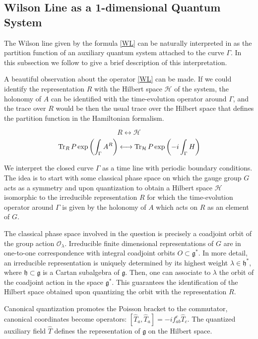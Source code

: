 \documentclass[11pt]{report}
\theoremstyle{plain}
\theoremstyle{definition}
\theoremstyle{remark}
\theoremstyle{remark}
\numberwithin{equation}{section}
\begin{document}
\subsection{Wilson Line as a 1-dimensional Quantum System}

The Wilson line given by the formula \eqref{WL} can be naturally interpreted in as the partition function of an auxiliary quantum system attached to the curve $\Gamma$. In this subsection we follow \cite{CB} to give a brief description of this interpretation. 

A beautiful observation about the operator \eqref{WL} can be made. If we could identify the representation $R$ with the Hilbert space $\mathcal{H}$ of the system, the holonomy of $A$ can be identified with the time-evolution operator around $\Gamma$, and the trace over $R$ would be then the usual trace over the Hilbert space that defines the partition function in the Hamiltonian formalism.

$$
R \longleftrightarrow \mathcal{H}
$$
\begin{equation}
{\rm Tr}_R \, P\exp\left( \int_\Gamma A^R\right) \longleftrightarrow  {\rm Tr}_{\mathcal{H}} \, P\exp\left( -i\int_\Gamma H\right)
\end{equation}

We interpret the closed curve $\Gamma$ as a time line with periodic boundary conditions. 
The idea is to start with some classical phase space on which the gauge group $G$ acts as a symmetry and upon quantization to obtain a Hilbert space $\mathcal{H}$ isomorphic to the irreducible representation $R$ for which the time-evolution operator around $\Gamma$ is given by the holonomy of $A$ which acts on $R$ as an element of $G$.

The classical phase space involved in the question is precisely a coadjoint orbit of the group action $\mathcal{O}_\lambda$. 
Irreducible finite dimensional representations of $G$ are in one-to-one correspondence with integral coadjoint orbits $O \subset \mathfrak{g}^*$. In more detail, an irreducible representation is uniquely determined by its highest weight $\lambda \in \mathfrak{h}^*$, where $\mathfrak{h} \subset \mathfrak{g}$ is a Cartan subalgebra of $\mathfrak{g}$. Then, one can associate to $\lambda$ the orbit of the coadjoint action in the space $\mathfrak{g}^*$. This guarantees the identification of the Hilbert space obtained upon quantizing the orbit with the representation $R$. 

Canonical quantization promotes the Poisson bracket to the commutator, canonical coordinates become operators: $[\hat{T}_a,  \hat{T}_a] = -if_{ab}^c \hat{T}_c$. The quantized auxiliary field $\hat{T}$ defines the representation of $\mathfrak{g}$ on the Hilbert space. 
\end{document}
